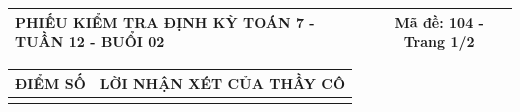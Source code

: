 \documentclass[12pt,a4paper]{article}
\begin{document}
\newpage
\noindent
\begin{tabularx}{\linewidth}{|X|c|}
\hline
\textbf{PHIẾU KIỂM TRA ĐỊNH KỲ TOÁN 7 - TUẦN 12 - BUỔI 02} & \textbf{Mã đề: 104 - Trang 1/2} \\
\hline
\end{tabularx}

\vspace{1.0mm}

\noindent
\begin{tabularx}{\linewidth}{|p{3.2cm}|X|}
\hline
\centering\textbf{ĐIỂM SỐ} & \centering\textbf{LỜI NHẬN XÉT CỦA THẦY CÔ} \tabularnewline
\hline
\rule{0pt}{1.8cm} & \tabularnewline
\hline
\end{tabularx}
\end{document}
